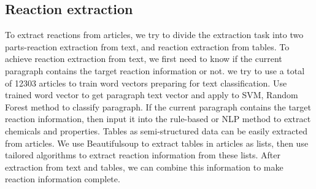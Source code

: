 \documentclass[%
 aip,
 jmp,%
 amsmath,amssymb,
 reprint,%
]{revtex4-2}
\begin{document}
\subsection{Reaction extraction}
To extract reactions from articles, we try to divide the extraction task into two parts-reaction extraction from text, 
and reaction extraction from tables. To achieve reaction extraction from text, we first need to know if the current paragraph
contains the target reaction information or not.
we try to use a total of 12303 articles to train word vectors preparing for text classification.
Use trained word vector to get paragraph text vector and apply to SVM, Random Forest method to classify paragraph.
If the current paragraph contains the target reaction information, then input it into the rule-based or NLP method to extract
chemicals and properties.
Tables as semi-structured data can be easily extracted from articles. We use Beautifulsoup to extract tables in articles as lists,
then use tailored algorithms to extract reaction information from these lists. 
After extraction from text and tables, we can combine this information to make reaction information complete.
\end{document}
